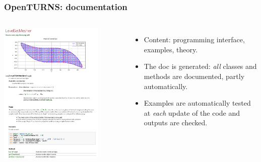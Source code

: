 \documentclass{beamer}
\begin{document}


\begin{frame}[containsverbatim]
\frametitle{OpenTURNS: documentation}

\small{

\begin{columns}

    \begin{center}
    \includegraphics[width=0.8\textwidth]{figures/exClasses.png}
    \end{center}


	\begin{itemize}
	\item Content: programming interface, 
	examples, theory.
	\item The doc is generated: \emph{all} classes and methods 
	are documented, partly automatically.
	\item Examples are automatically tested at \emph{each} update 
	of the code and outputs are checked.
	\end{itemize}
	
\end{columns}

}
\end{frame}
\end{document}
